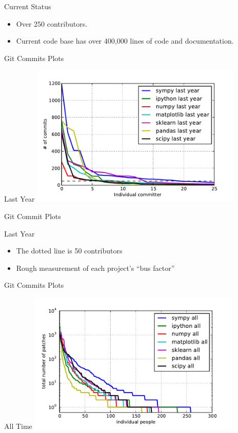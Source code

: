 \documentclass[xcolor=svgnames]{beamer}
\begin{document}
\begin{frame}
  \begin{block}{Current Status}
    \begin{itemize}
    \item Over 250 contributors.
    \item Current code base has over 400,000 lines of code and documentation.
    \end{itemize}
  \end{block}
\end{frame}

\begin{frame}{Git Commits Plots}
\begin{block}{Last Year}
\includegraphics[width=4in]{commits1.pdf}
\end{block}
\end{frame}

\begin{frame}{Git Commit Plots}
\begin{block}{Last Year}
\begin{itemize}
\item The dotted line is 50 contributors
\item Rough measurement of each project's ``bus factor''
\end{itemize}
\end{block}
\end{frame}

\begin{frame}{Git Commits Plots}
\begin{block}{All Time}
\includegraphics[width=4in]{commits-all.pdf}
\end{block}
\end{frame}
\end{document}
